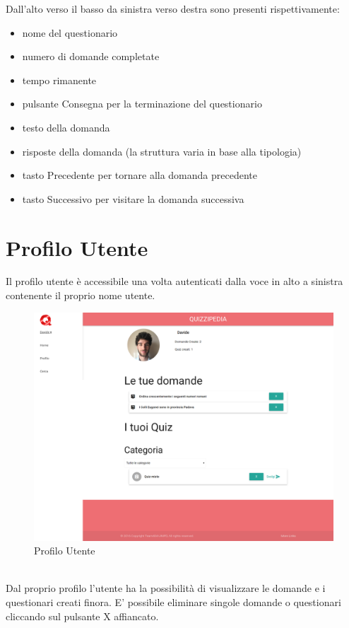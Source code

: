 \documentclass[a4paper,11pt]{article}
\begin{document}
	Dall'alto verso il basso da sinistra verso destra sono presenti rispettivamente:
	\begin{itemize}
	\item nome del questionario
	\item numero di domande completate
	\item tempo rimanente
	\item pulsante Consegna per la terminazione del questionario
	\item testo della domanda
	\item risposte della domanda (la struttura varia in base alla tipologia)
	\item tasto Precedente per tornare alla domanda precedente
	\item tasto Successivo per visitare la domanda successiva
	\end{itemize}
	
	\newpage
	\section{Profilo Utente}
	Il profilo utente è accessibile una volta autenticati dalla voce in alto a sinistra contenente il proprio nome utente.\\
	\begin{figure}[h!]
	\begin{center}
	\includegraphics[scale=0.3]{../images/screen_profile.png}
	\caption{Profilo Utente}
	\end{center}
	\end{figure}
	\\
	Dal proprio profilo l'utente ha la possibilità di visualizzare le domande e i questionari creati finora.
	E' possibile eliminare singole domande o questionari cliccando sul pulsante X affiancato.\\ 
	\newpage
\end{document}
